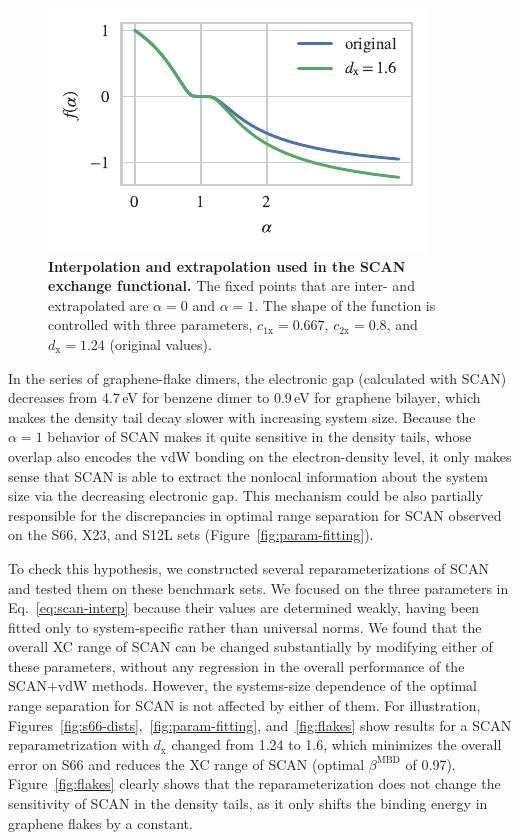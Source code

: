\begin{figure}
\centering
\includegraphics{../media/scan-interp}
\caption{\textbf{Interpolation and extrapolation used in the SCAN exchange functional.}
The fixed points that are inter- and extrapolated are $\alpha=0$ and $\alpha=1$.
The shape of the function is controlled with three parameters, $c_\mathrm{1x}=0.667$, $c_\mathrm{2x}=0.8$, and $d_\mathrm x=1.24$ (original values).
}\label{fig:scan-interp}
\end{figure}

In the series of graphene-flake dimers, the electronic gap (calculated with SCAN) decreases from 4.7\,eV for benzene dimer to 0.9\,eV for graphene bilayer, which makes the density tail decay slower with increasing system size.
Because the $\alpha=1$ behavior of SCAN makes it quite sensitive in the density tails, whose overlap also encodes the vdW bonding on the electron-density level, it only makes sense that SCAN is able to extract the nonlocal information about the system size via the decreasing electronic gap.
This mechanism could be also partially responsible for the discrepancies in optimal range separation for SCAN observed on the S66, X23, and S12L sets (Figure~\ref{fig:param-fitting}).

To check this hypothesis, we constructed several reparameterizations of SCAN and tested them on these benchmark sets.
We focused on the three parameters in Eq.~\ref{eq:scan-interp} because their values are determined weakly, having been fitted only to system-specific rather than universal norms.
We found that the overall XC range of SCAN can be changed substantially by modifying either of these parameters, without any regression in the overall performance of the SCAN+vdW methods.
However, the systems-size dependence of the optimal range separation for SCAN is not affected by either of them.
For illustration, Figures~\ref{fig:s66-dists},~\ref{fig:param-fitting}, and~\ref{fig:flakes} show results for a SCAN reparametrization with $d_\mathrm x$ changed from 1.24 to 1.6, which minimizes the overall error on S66 and reduces the XC range of SCAN (optimal $\beta^\text{MBD}$ of 0.97).
Figure~\ref{fig:flakes} clearly shows that the reparameterization does not change the sensitivity of SCAN in the density tails, as it only shifts the binding energy in graphene flakes by a constant.

